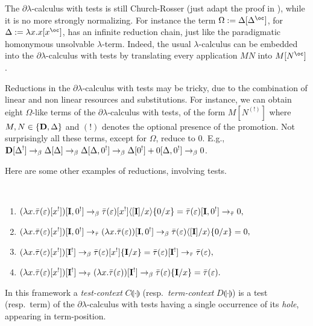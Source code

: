 \documentclass{LMCS}
\newcommand{\dlam}{\ensuremath{\partial\lambda}}
\newcommand{\lam}{\ensuremath{\lambda}}
\newcommand{\bang}{\oc}
\renewcommand{\hole}[1]{\llparenthesis #1\rrparenthesis}
\newcommand{\subst}[2]{\{ #2 / #1 \}}	\newcommand{\dg}[2]{\mathrm{deg}_{#1}(#2)} \newcommand{\obsle}{\sqsubseteq_{\mathcal{O}}}
\newcommand{\ass}{:=}
\newcommand{\gto}{\ensuremath{\bar\tau}}
\begin{document}
The \dlam-calculus with tests is still Church-Rosser (just adapt the proof in \cite{PaganiT09}), while it is no more strongly normalizing. 
For instance the term $\Omega \ass \Delta[\Delta^\bang]$, for $\Delta \ass \lam x.x[x^\bang]$, has an infinite reduction chain, just like the paradigmatic homonymous unsolvable \lam-term.
Indeed, the usual \lam-calculus can be embedded into the \dlam-calculus with tests by
translating every application $MN$ into $M[N^{\bang}]$.

\begin{rem}
Reductions in the  \dlam-calculus with tests may be  tricky, due to the combination of linear and non linear resources and substitutions.
For instance, we can obtain eight $\Omega$-like terms of the \dlam-calculus with tests, of the form $M[N^{(!)}]$ where $M,N\in \{\bold{D},\Delta\}$ and $(!)$
 denotes the optional presence of the promotion. Not surprisingly all these terms, except for $\Omega$, reduce to $0$. E.g., 
 $\bold{D}[\Delta^!]\to_{\beta} \Delta[\Delta] \to_{\beta} \Delta[\Delta,0^!] \to_{\beta} \Delta[0^!] + 0[\Delta,0^!] \to_{\beta} 0$.
\end{rem}

Here are some other examples of reductions, involving tests.

\begin{exa} \
\begin{enumerate}[1.]
\item $(\lambda x. \gto(\varepsilon)[x^!])[\bold{I},0^!]\to_{\beta}
	\gto(\varepsilon)[x^!]\lsubst{x}{[\bold{I}]}\subst{x}{0}=
	\gto(\varepsilon)[\bold{I},0^!]\to_{\gto } 0,$
	\item $(\lambda x. \gto(\varepsilon)[x^!])[\bold{I},0^!]\to_{\gto }
	(\lambda x. \gto(\varepsilon))[\bold{I},0^!]\to_{\beta}
	\gto(\varepsilon)\lsubst{x}{[\bold{I}]}\subst{x}{0}=0,$
\item $(\lambda x. \gto(\varepsilon)[x^!])[\bold{I}^!]\to_{\beta}
	\gto(\varepsilon)[x^!]\subst{x}{\bold{I}}=
	\gto(\varepsilon)[\bold{I}^!]\to_{\gto } \gto(\varepsilon),$
\item $(\lambda x. \gto(\varepsilon)[x^!])[\bold{I}^!]\to_{\gto }
	(\lambda x. \gto(\varepsilon))[\bold{I}^!]\to_{\beta}
	\gto(\varepsilon)\subst{x}{\bold{I}}= \gto(\varepsilon).$
\end{enumerate}
\end{exa}

In this framework a \emph{test-context} $C\hole{\cdot}$ (resp.\ \emph{term-context} $D\hole{\cdot}$) is a test (resp.\ term) of the \dlam-calculus with tests 
having a single occurrence of its \emph{hole}, appearing in term-position.
\end{document}
